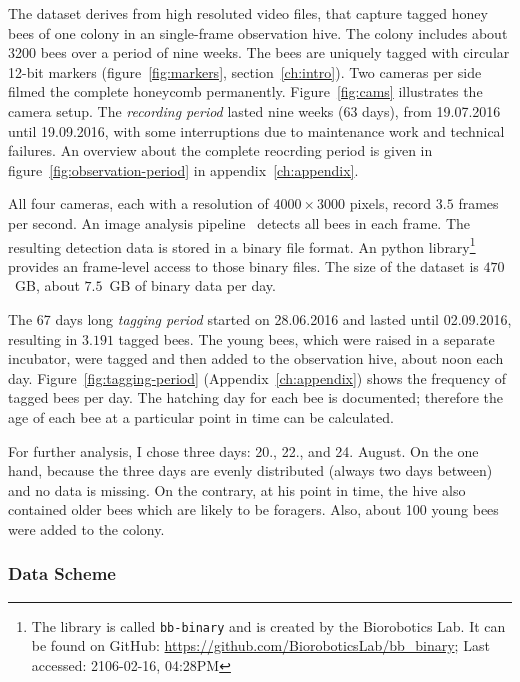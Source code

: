 The dataset derives from high resoluted video files, that capture tagged honey bees of one colony in an single-frame observation hive.
The colony includes about 3200 bees over a period of nine weeks. The bees are uniquely tagged with circular 12-bit markers (figure~\ref{fig:markers}, section~\ref{ch:intro}).
Two cameras per side filmed the complete honeycomb permanently.
Figure~\ref{fig:cams} illustrates the camera setup.
The \emph{recording period} lasted nine weeks (63 days), from 19.07.2016 until 19.09.2016, with some interruptions due to maintenance work and technical failures. An overview about the complete reocrding period is given in figure~\ref{fig:observation-period} in appendix~\ref{ch:appendix}.

All four cameras, each with a resolution of $4000\times3000$ pixels, record $3.5$ frames per second. 
An image analysis pipeline~\cite{wario2015automatic} detects all bees in each frame.
The resulting detection data is stored in a binary file format.
An python library\footnote{The library is called \texttt{bb-binary} and is created by the Biorobotics Lab. It can be found on GitHub: \url{https://github.com/BioroboticsLab/bb_binary}; Last accessed: 2106-02-16, 04:28PM} provides an frame-level access to those binary files.
The size of the dataset is $470$~GB, about $7.5$~GB of binary data per day.

The 67 days long \emph{tagging period} started on 28.06.2016 and lasted until 02.09.2016, resulting in $3.191$ tagged bees. The young bees, which were raised in a separate incubator, were tagged and then added to the observation hive, about noon each day. Figure~\ref{fig:tagging-period} (Appendix~\ref{ch:appendix}) shows the frequency of tagged bees per day. The hatching day for each bee is documented; therefore the age of each bee at a particular point in time can be calculated.

For further analysis, I chose three days: 20., 22., and 24. August. On the one hand, because the three days are evenly distributed (always two days between) and no data is missing. On the contrary, at his point in time, the hive also contained older bees which are likely to be foragers. Also, about 100 young bees were added to the colony.

\clearpage
\subsubsection{Data Scheme}
\label{subsec:datascheme}

